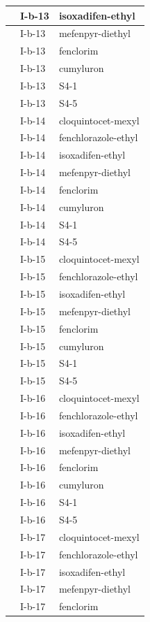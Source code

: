 \documentclass[11pt,a4paper]{article}
\begin{document}
\begin{table}[h]
\begin{tabular}{|l|l|l|}
 & I-b-13 & isoxadifen-ethyl \\ \hline
 & I-b-13 & mefenpyr-diethyl \\ \hline
 & I-b-13 & fenclorim \\ \hline
 & I-b-13 & cumyluron \\ \hline
 & I-b-13 & S4-1 \\ \hline
 & I-b-13 & S4-5 \\ \hline
 & I-b-14 & cloquintocet-mexyl \\ \hline
 & I-b-14 & fenchlorazole-ethyl \\ \hline
 & I-b-14 & isoxadifen-ethyl \\ \hline
 & I-b-14 & mefenpyr-diethyl \\ \hline
 & I-b-14 & fenclorim \\ \hline
 & I-b-14 & cumyluron \\ \hline
 & I-b-14 & S4-1 \\ \hline
 & I-b-14 & S4-5 \\ \hline
 & I-b-15 & cloquintocet-mexyl \\ \hline
 & I-b-15 & fenchlorazole-ethyl \\ \hline
 & I-b-15 & isoxadifen-ethyl \\ \hline
 & I-b-15 & mefenpyr-diethyl \\ \hline
 & I-b-15 & fenclorim \\ \hline
 & I-b-15 & cumyluron \\ \hline
 & I-b-15 & S4-1 \\ \hline
 & I-b-15 & S4-5 \\ \hline
 & I-b-16 & cloquintocet-mexyl \\ \hline
 & I-b-16 & fenchlorazole-ethyl \\ \hline
 & I-b-16 & isoxadifen-ethyl \\ \hline
 & I-b-16 & mefenpyr-diethyl \\ \hline
 & I-b-16 & fenclorim \\ \hline
 & I-b-16 & cumyluron \\ \hline
 & I-b-16 & S4-1 \\ \hline
 & I-b-16 & S4-5 \\ \hline
 & I-b-17 & cloquintocet-mexyl \\ \hline
 & I-b-17 & fenchlorazole-ethyl \\ \hline
 & I-b-17 & isoxadifen-ethyl \\ \hline
 & I-b-17 & mefenpyr-diethyl \\ \hline
 & I-b-17 & fenclorim \\ \hline

\end{tabular}
\end{table}
\end{document}
